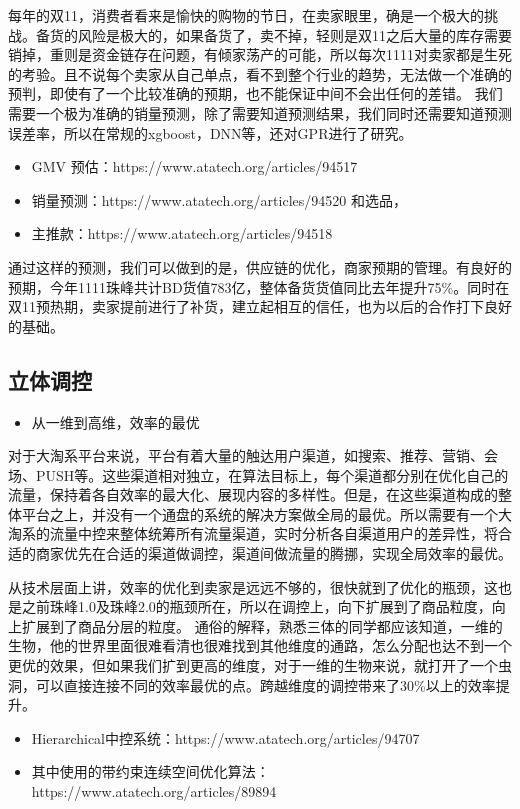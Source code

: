 每年的双11，消费者看来是愉快的购物的节日，在卖家眼里，确是一个极大的挑战。备货的风险是极大的，如果备货了，卖不掉，轻则是双11之后大量的库存需要销掉，重则是资金链存在问题，有倾家荡产的可能，所以每次1111对卖家都是生死的考验。且不说每个卖家从自己单点，看不到整个行业的趋势，无法做一个准确的预判，即使有了一个比较准确的预期，也不能保证中间不会出任何的差错。
我们需要一个极为准确的销量预测，除了需要知道预测结果，我们同时还需要知道预测误差率，所以在常规的xgboost，DNN等，还对GPR进行了研究。
\begin{itemize}
\item GMV 预估：https://www.atatech.org/articles/94517
\item 销量预测：https://www.atatech.org/articles/94520
\newline 和选品，

\item 主推款：https://www.atatech.org/articles/94518
\end{itemize}

通过这样的预测，我们可以做到的是，供应链的优化，商家预期的管理。有良好的预期，今年1111珠峰共计BD货值783亿，整体备货货值同比去年提升75\%。同时在双11预热期，卖家提前进行了补货，建立起相互的信任，也为以后的合作打下良好的基础。

\subsection{立体调控}
\begin{itemize}
\item 从一维到高维，效率的最优
\end{itemize}

对于大淘系平台来说，平台有着大量的触达用户渠道，如搜索、推荐、营销、会场、PUSH等。这些渠道相对独立，在算法目标上，每个渠道都分别在优化自己的流量，保持着各自效率的最大化、展现内容的多样性。但是，在这些渠道构成的整体平台之上，并没有一个通盘的系统的解决方案做全局的最优。所以需要有一个大淘系的流量中控来整体统筹所有流量渠道，实时分析各自渠道用户的差异性，将合适的商家优先在合适的渠道做调控，渠道间做流量的腾挪，实现全局效率的最优。

从技术层面上讲，效率的优化到卖家是远远不够的，很快就到了优化的瓶颈，这也是之前珠峰1.0及珠峰2.0的瓶颈所在，所以在调控上，向下扩展到了商品粒度，向上扩展到了商品分层的粒度。
通俗的解释，熟悉三体的同学都应该知道，一维的生物，他的世界里面很难看清也很难找到其他维度的通路，怎么分配也达不到一个更优的效果，但如果我们扩到更高的维度，对于一维的生物来说，就打开了一个虫洞，可以直接连接不同的效率最优的点。跨越维度的调控带来了30\%以上的效率提升。
\begin{itemize}
\item Hierarchical中控系统：https://www.atatech.org/articles/94707
\item 其中使用的带约束连续空间优化算法：https://www.atatech.org/articles/89894
\end{itemize}

